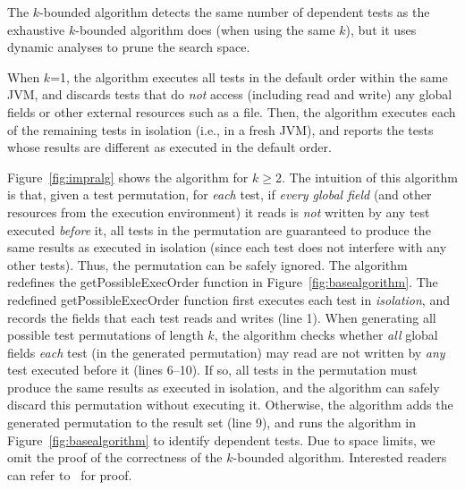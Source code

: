 

The \dependenceaware{} $k$-bounded algorithm
detects the same number of dependent tests
as the exhaustive $k$-bounded algorithm does (when using the same $k$),
but it uses dynamic analyses to prune the search space.

When $k$=1, the algorithm executes all tests in the default order
within the same JVM, and discards tests that do \textit{not}
access (including read and write) any global fields or
other external resources such as a file. Then,
the algorithm executes each of the remaining tests in isolation (i.e., in a fresh JVM),
and reports the tests whose results are different as executed in
the default order.

Figure~\ref{fig:impralg} shows the algorithm for $k$$\ge$2.
%
The intuition of this algorithm is that, given
a test permutation, for \textit{each} test,
if \textit{every global field} (and other 
resources from the execution environment) it reads
is \textit{not} written by any test executed \textit{before} it,
all tests in the permutation are guaranteed to produce
the same results as executed in isolation (since each
test does not interfere with any other tests). Thus, the permutation
can be safely ignored. 
The algorithm redefines
the getPossibleExecOrder function in Figure~\ref{fig:basealgorithm}.
The redefined getPossibleExecOrder function first executes
each test in \textit{isolation}, and records the
fields that each test reads and writes (line 1).
When generating all possible test permutations
of length $k$, the algorithm checks whether
\textit{all} global fields \textit{each} test (in the generated permutation)
may read are not written by \textit{any} test executed before it (lines 6--10).
If so, all tests in the permutation
must produce the same results as executed in isolation,
and the algorithm can safely discard this permutation without
executing it. Otherwise, the algorithm adds the generated
permutation to the result set (line 9), and runs the algorithm in Figure~\ref{fig:basealgorithm}
to identify dependent tests. %
Due to space limits, we omit the proof of the correctness
of the \dependenceaware{} $k$-bounded algorithm. Interested
readers can refer to~\cite{proof-dependence-aware} for proof.

